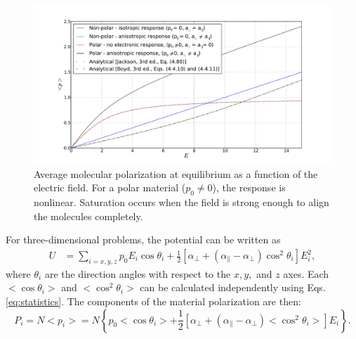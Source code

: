 \documentclass[12pt,letterpaper]{article}
\begin{document}
\begin{figure}[ht]
    \includegraphics[width=17.2cm]{static_polarization.pdf}
    \caption{Average molecular polarization at equilibrium as a function of the electric field. For a polar material ($p_0\neq 0$), the response is nonlinear. Saturation occurs when the field is strong enough to align the molecules completely.}
    \label{fig:stat_pol}
\end{figure} 

For three-dimensional problems, the potential can be written as 
\begin{align}\label{eq:potential_altern}
U &= \sum_{i=x,y,z} p_0E_i\cos\theta_i+\frac{1}{2}\left[\alpha_\bot + (\alpha_\parallel - \alpha_\bot)\cos^2\theta_i\right]E_i^2,
\end{align}
where $\theta_i$ are the direction angles with respect to the $x,y,$ and $z$ axes. Each $<\cos\theta_i>$ and $<\cos^2\theta_i>$ can be calculated independently using Eqs. \eqref{eq:statistics}. The components of the material polarization are then:
\begin{equation}\label{eq:pol_components}
 P_i=N<p_i>=N\left\lbrace p_0<\cos\theta_i>+\frac{1}{2}\left[\alpha_\bot + (\alpha_\parallel - \alpha_\bot)<\cos^2\theta_i>\right]E_i\right\rbrace.
\end{equation}
\end{document}
